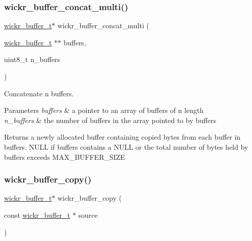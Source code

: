 \subsubsection{\texorpdfstring{wickr\_buffer\_concat\_multi()}{wickr\_buffer\_concat\_multi()}}
{\footnotesize\ttfamily \mbox{\hyperlink{structwickr__buffer}{wickr\+\_\+buffer\+\_\+t}}$\ast$ wickr\+\_\+buffer\+\_\+concat\+\_\+multi (\begin{DoxyParamCaption}\item[{\mbox{\hyperlink{structwickr__buffer}{wickr\+\_\+buffer\+\_\+t}} $\ast$$\ast$}]{buffers,  }\item[{uint8\+\_\+t}]{n\+\_\+buffers }\end{DoxyParamCaption})}



Concatenate n buffers. 


\begin{DoxyParams}{Parameters}
{\em buffers} & a pointer to an array of buffers of n length \\
\hline
{\em n\+\_\+buffers} & the number of buffers in the array pointed to by buffers \\
\hline
\end{DoxyParams}
\begin{DoxyReturn}{Returns}
a newly allocated buffer containing copied bytes from each buffer in \textquotesingle{}buffers\textquotesingle{}. N\+U\+LL if \textquotesingle{}buffers\textquotesingle{} contains a N\+U\+LL or the total number of bytes held by \textquotesingle{}buffers\textquotesingle{} exceeds M\+A\+X\+\_\+\+B\+U\+F\+F\+E\+R\+\_\+\+S\+I\+ZE 
\end{DoxyReturn}
\mbox{\label{group__wickr__buffer_gada179dda91e748d7bdf6028d3d4c4bcd}} 
\subsubsection{\texorpdfstring{wickr\_buffer\_copy()}{wickr\_buffer\_copy()}}
{\footnotesize\ttfamily \mbox{\hyperlink{structwickr__buffer}{wickr\+\_\+buffer\+\_\+t}}$\ast$ wickr\+\_\+buffer\+\_\+copy (\begin{DoxyParamCaption}\item[{const \mbox{\hyperlink{structwickr__buffer}{wickr\+\_\+buffer\+\_\+t}} $\ast$}]{source }\end{DoxyParamCaption})}



